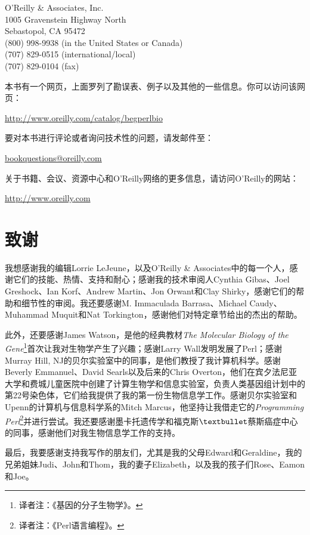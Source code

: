 \begin{adjustwidth}{4em}{0cm}
O'Reilly \& Associates, Inc.\\
1005 Gravenstein Highway North\\
Sebastopol, CA 95472\\
(800) 998-9938 (in the United States or Canada)\\
(707) 829-0515 (international/local)\\
(707) 829-0104 (fax)
\end{adjustwidth}

本书有一个网页，上面罗列了勘误表、例子以及其他的一些信息。你可以访问该网页：

\href{http://www.oreilly.com/catalog/begperlbio}{http://www.oreilly.com/catalog/begperlbio}

要对本书进行评论或者询问技术性的问题，请发邮件至：

\href{bookquestions@oreilly.com}{bookquestions@oreilly.com}

关于书籍、会议、资源中心和O'Reilly网络的更多信息，请访问O'Reilly的网站：

\href{http://www.oreilly.com}{http://www.oreilly.com}

\section*{致谢}
我想感谢我的编辑Lorrie LeJeune，以及O'Reilly \& Associates中的每一个人，感谢它们的技能、热情、支持和耐心；感谢我的技术审阅人Cynthia Gibas、Joel Greshock、Ian Korf、Andrew Martin、Jon Orwant和Clay Shirky，感谢它们的帮助和细节性的审阅。我还要感谢M. Immaculada Barrasa、Michael Caudy、Muhammad Muquit和Nat Torkington，感谢他们对特定章节给出的杰出的帮助。

此外，还要感谢James Watson，是他的经典教材\textit{The Molecular Biology of the Gene}\footnote{译者注：《基因的分子生物学》。}首次让我对生物学产生了兴趣；感谢Larry Wall发明发展了Perl；感谢Murray Hill, NJ的贝尔实验室中的同事，是他们教授了我计算机科学。感谢Beverly Emmanuel、David Searls以及后来的Chris Overton，他们在宾夕法尼亚大学和费城儿童医院中创建了计算生物学和信息实验室，负责人类基因组计划中的第22号染色体，它们给我提供了我的第一份生物信息学工作。感谢贝尔实验室和Upenn的计算机与信息科学系的Mitch Marcus，他坚持让我借走它的\textit{Programming Perl}\footnote{译者注：《Perl语言编程》。}并进行尝试。我还要感谢墨卡托遗传学和福克斯$\textbullet$蔡斯癌症中心的同事，感谢他们对我生物信息学工作的支持。 

最后，我要感谢支持我写作的朋友们，尤其是我的父母Edward和Geraldine，我的兄弟姐妹Judi、John和Thom，我的妻子Elizabeth，以及我的孩子们Rose、Eamon和Joe。

\clearpage
\thispagestyle{empty}
